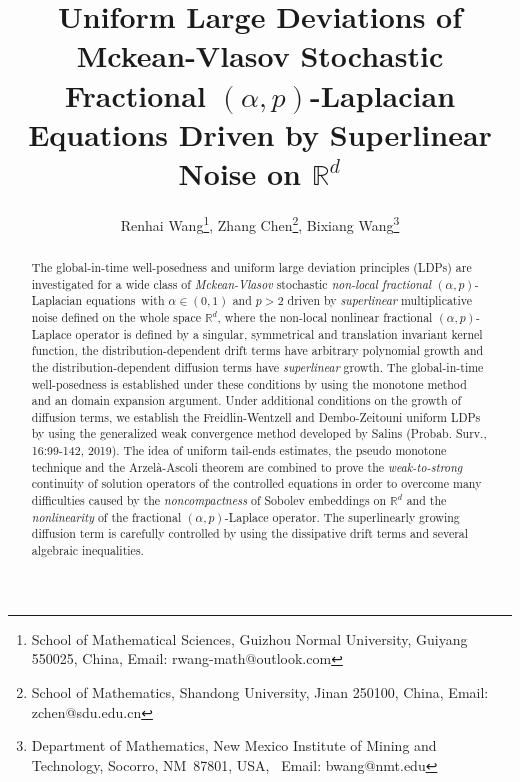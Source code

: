 \documentclass[11pt]{article}
\numberwithin{equation}{section}
\begin{document}
\baselineskip


\pagestyle{plain}

\title{\bf
Uniform Large Deviations of Mckean-Vlasov
Stochastic Fractional $(\alpha,p)$-Laplacian
Equations Driven by Superlinear Noise on $\mathbb{R}^d$
  }






\author{
Renhai  Wang\footnote{School of Mathematical Sciences, Guizhou Normal University, Guiyang 550025, China,
 Email:   rwang-math@outlook.com},\;
 Zhang Chen\footnote{School of Mathematics,
 Shandong University, Jinan 250100,   China,
 Email:   zchen@sdu.edu.cn},\;
 Bixiang Wang\footnote{
Department of Mathematics, New Mexico Institute of Mining and
Technology,  Socorro,  NM~87801, USA, \
Email: bwang@nmt.edu} }

\date{}

\maketitle




\medskip



\begin{abstract}
The global-in-time well-posedness and uniform
large deviation principles (LDPs) are investigated for a wide class of
\emph{Mckean-Vlasov}
stochastic \emph{non-local fractional} $(\alpha,p)$-Laplacian equations\
with $\alpha \in (0,1)$ and $p>2$ driven by \emph{superlinear}
multiplicative noise
 defined on the whole space $\mathbb{R}^d$, where the non-local nonlinear fractional  $(\alpha,p)$-Laplace operator
is defined by a singular, symmetrical and
translation invariant kernel function,
the distribution-dependent drift terms have arbitrary polynomial growth
  and the distribution-dependent diffusion terms have \emph{superlinear}  growth. The global-in-time well-posedness is established under these  conditions by using the
monotone method and an   domain expansion   argument.
Under additional conditions on
  the growth  of   diffusion  terms,
  we  establish the Freidlin-Wentzell and Dembo-Zeitouni uniform LDPs by using the generalized weak convergence method developed by Salins (Probab.
Surv., 16:99-142, 2019). The idea of uniform tail-ends estimates, the pseudo monotone technique and the Arzel\`{a}-Ascoli theorem are combined to prove the \emph{weak-to-strong} continuity of solution operators of the controlled
equations in order to overcome many difficulties caused by the \emph{noncompactness} of Sobolev embeddings on $\mathbb{R}^d$
and  the \emph{nonlinearity} of the fractional $(\alpha,p)$-Laplace
operator.
The superlinearly growing diffusion
 term is  carefully controlled by
 using the
  dissipative drift terms and several algebraic inequalities.
\end{abstract}
\end{document}
